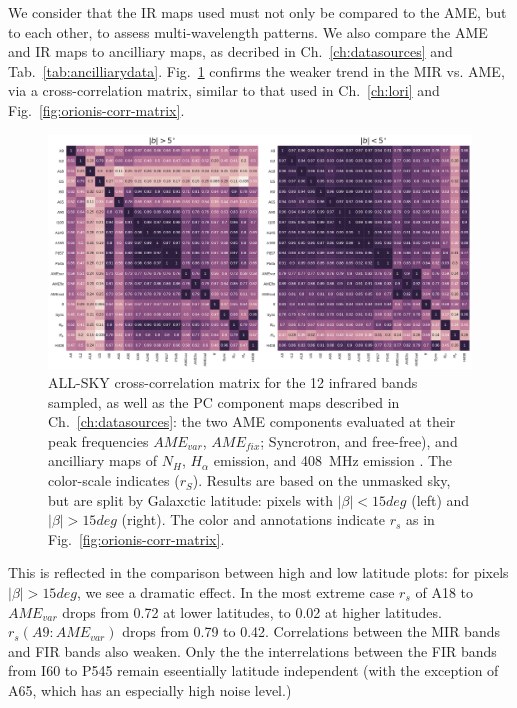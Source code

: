         We consider that the IR maps used must not only be compared to the AME, but to each other, to assess multi-wavelength patterns. We also compare the AME and IR maps to ancilliary maps, as decribed in Ch.~\ref{ch:datasources} and Tab.~\ref{tab:ancilliarydata}. Fig.~\ref{fig:all_bands_corr_matrix_wAME_spearman} confirms the weaker trend in the MIR vs. AME, via a cross-correlation matrix, similar to that used in Ch.~\ref{ch:lori} and Fig.~\ref{fig:orionis-corr-matrix}.
          \begin{figure}
            \includegraphics[width=\textwidth]{../Plots/ch_allsky/all_bands_corr_matrix_wAME_spearmanintensity_unmasked.pdf}
            \centering
            \caption{ALL-SKY cross-correlation matrix for the 12 infrared bands sampled, as well as the PC component maps described in Ch.~\ref{ch:datasources}: the two AME components evaluated at their peak frequencies $AME_{var}$, $AME_{fix}$; Syncrotron, and free-free), and ancilliary maps of $N_{H}$, $H_{\alpha{}}$ emission, and 408~MHz emission \cite{haslam82}. The color-scale indicates ($r_{S}$). Results are based on the unmasked sky, but are split by Galaxctic latitude: pixels with $|\beta{}| < 15deg$ (left) and $|\beta{}| > 15deg$ (right). The color and annotations indicate $r_{s}$ as in Fig.~\ref{fig:orionis-corr-matrix}. }
            \label{fig:all_bands_corr_matrix_wAME_spearman}
          \end{figure}
       This is reflected in the comparison between high and low latitude plots: for pixels $|\beta| > 15 deg$, we see a dramatic effect. In the most extreme case $r_{s}$ of A18 to $AME_{var}$ drops from 0.72 at lower latitudes, to 0.02 at higher latitudes. $r_{s}(A9:AME_{var})$ drops from 0.79 to 0.42. Correlations between the MIR bands and FIR bands also weaken. Only the the interrelations between the FIR bands from I60 to P545 remain eseentially latitude independent (with the exception of A65, which has an especially high noise level.)

